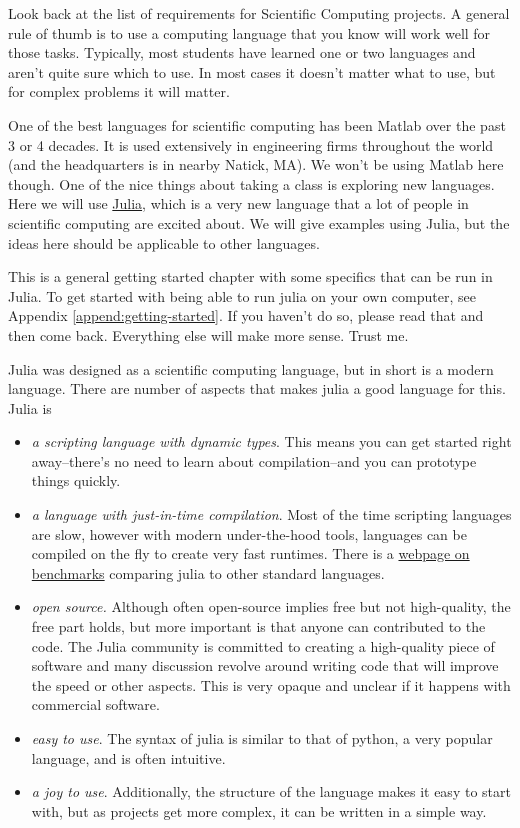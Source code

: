 Look back at the list of requirements for Scientific Computing projects.
A general rule of thumb is to use a computing language that you know
will work well for those tasks. Typically, most students have learned
one or two languages and aren't quite sure which to use. In most cases
it doesn't matter what to use, but for complex problems it will matter.

One of the best languages for scientific computing has been Matlab over
the past 3 or 4 decades. It is used extensively in engineering firms
throughout the world (and the headquarters is in nearby Natick, MA). We won't be
using Matlab here though. One of the nice things about taking a class is
exploring new languages. Here we will use
\href{http://julialang.org}{Julia}, which is a very new language that a
lot of people in scientific computing are excited about. We will give
examples using Julia, but the ideas here should be applicable to other
languages.

This is a general getting started chapter with some specifics that can
be run in Julia. To get started with being able to run julia on your own
computer, see Appendix \ref{append:getting-started}.  If you haven't do so, please read that and then come back.  Everything else will make more sense.  Trust me.

Julia was designed as a scientific computing language, but in short is a modern language.  There are number of aspects that makes julia a good language for this. Julia is 

\begin{itemize}
\item \emph{a scripting language with dynamic types}.  This means you can get started right away--there's no need to learn about compilation--and you can prototype things quickly. 
\item \emph{a language with just-in-time compilation}.  Most of the time scripting languages are slow, however with modern under-the-hood tools, languages can be compiled on the fly to create very fast runtimes.  There is a \href{https://www.julialang.org/benchmarks/}{webpage on benchmarks} comparing julia to other standard languages.
\item \emph{open source.}  Although often open-source implies free but not high-quality, the free part holds, but more important is that anyone can contributed to the code.  The Julia community is committed to creating a high-quality piece of software and many discussion revolve around writing code that will improve the speed or other aspects.  This is very opaque and unclear if it happens with commercial software. 
\item \emph{easy to use}. The syntax of julia is similar to that of python, a very popular language, and is often intuitive.  
\item \emph{a joy to use}.  Additionally, the structure of the language makes it easy to start with, but as projects get more complex, it can be written in a simple way.  
\end{itemize}

